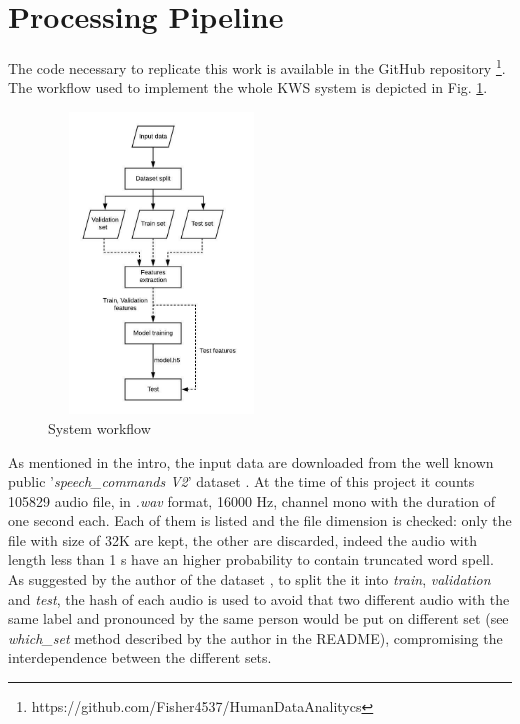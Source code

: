 \section{Processing Pipeline}
\label{sec:processing_pipeine}

\noindent The code necessary to replicate this work is available in the GitHub repository \footnote{https://github.com/Fisher4537/HumanDataAnalitycs}.\\
The workflow used to implement the whole KWS system is depicted in Fig. \ref{fig:pipeline}.
\begin{figure}[h]
			\centering
	    	\includegraphics[width=6cm, height=8cm ,width=0.25\textwidth]{pipeline}
	    	\caption{System workflow}
	    	\label{fig:pipeline}
\end{figure} 
\noindent As mentioned in the intro, the input data are downloaded from the well known public '{\it{speech\_commands V2}}' dataset \cite{Warden-2018}. At the time of this project it counts 105829 audio file, in \textit{.wav} format, 16000 Hz, channel mono with the duration of one second each. Each of them is listed and the file dimension is checked: only the file with size of 32K are kept, the other are discarded, indeed the audio with length less than 1 s have an higher probability to contain truncated word spell. \\
As suggested by the author of the dataset \cite{Warden-2018}, to split the it into \textit{train}, \textit{validation} and \textit{test}, the hash of each audio is used to avoid that two different audio with the same label and pronounced by the same person would be put on different set (see \textit{which\_set} method described by the author in the README), compromising the interdependence between the different sets. \\

